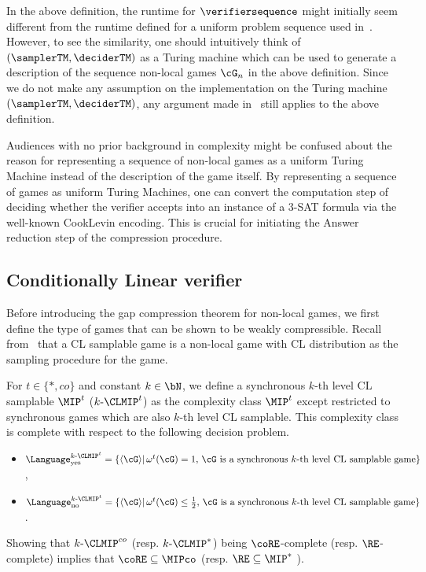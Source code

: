 In the above definition, the runtime for $\verifiersequence$ might initially seem different from the runtime defined for a uniform problem sequence used in~. However, to see the similarity, one should intuitively think of $(\samplerTM, \deciderTM)$ as a Turing machine which can be used to generate a description of the sequence non-local games $\cG_n$ in the above definition. Since we do not make any assumption on the implementation on the Turing machine $ (\samplerTM, \deciderTM)$, any argument made in~ still applies to the above definition. 

Audiences with no prior background in complexity might be confused about the reason for representing a sequence of non-local games as a uniform Turing Machine instead of the description of the game itself. By representing a sequence of games as uniform Turing Machines, one can convert the computation step of deciding whether the verifier accepts into an instance of a 3-SAT formula via the well-known Cook\text{-}Levin encoding. This is crucial for initiating the Answer reduction step of the compression procedure. 


\subsection{Conditionally Linear verifier} \label{sec:CLverifier}

Before introducing the gap compression theorem for non-local games, we first define the type of games that can be shown to be weakly compressible. Recall from~ that a CL samplable game is a non-local game with CL distribution as the sampling procedure for the game. 

For $t \in  \{*, co\}$ and constant $k \in \bN$, we define a synchronous $k$-th level CL samplable $\MIP^t$ ($k\text{-}\CLMIP^t$) as the complexity class $\MIP^t$ except restricted to synchronous games which are also $k$-th level CL samplable. This complexity class is complete with respect to the following decision problem.  
\begin{itemize}
	\item $\Language^{k\text{-}\CLMIP^t}_{\text{yes}} = \{\langle \cG\rangle | \, \omega^t(\cG) = 1, \, \cG\text{ is a synchronous $k$-th level CL samplable game}\} $, 
	\item $\Language^{k\text{-}\CLMIP^t}_{\text{no}} = \{\langle \cG \rangle | \, \omega^t(\cG) \leq \frac{1}{2}, \, \cG\text{ is a synchronous $k$-th level CL samplable game}\}$. 
\end{itemize}
Showing that $k\text{-}\CLMIP^{co}$ (resp. $k\text{-}\CLMIP^*$) being $\coRE$-complete (resp. $\RE$-complete) implies that $\coRE \subseteq \MIPco$ (resp. $\RE \subseteq \MIP^*$ ). 

